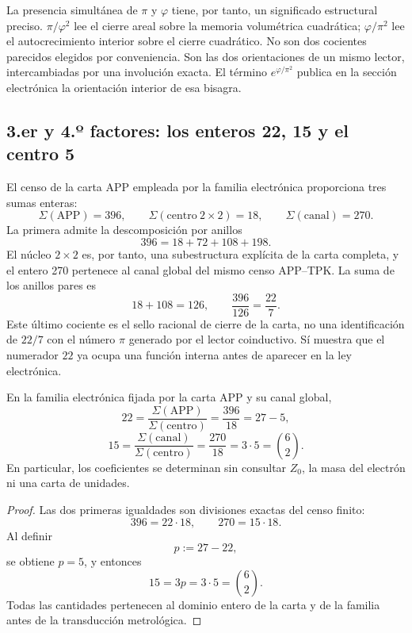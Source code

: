La presencia simultánea de \(\pi\) y \(\varphi\) tiene, por tanto, un
significado estructural preciso. \(\pi/\varphi^2\) lee el cierre areal
sobre la memoria volumétrica cuadrática; \(\varphi/\pi^2\) lee el
autocrecimiento interior sobre el cierre cuadrático. No son dos cocientes
parecidos elegidos por conveniencia. Son las dos orientaciones de un mismo
lector, intercambiadas por una involución exacta. El término
\(e^{\varphi/\pi^2}\) publica en la sección electrónica la orientación
interior de esa bisagra.

\subsection{3.er y 4.º factores: los enteros 22, 15 y el centro 5}

El censo de la carta APP empleada por la familia electrónica proporciona
tres sumas enteras:
\[
 \Sigma(\mathrm{APP})=396,
 \qquad
 \Sigma(\mathrm{centro}\ 2\times2)=18,
 \qquad
 \Sigma(\mathrm{canal})=270.
\]
La primera admite la descomposición por anillos
\[
 396=18+72+108+198.
\]
El núcleo \(2\times2\) es, por tanto, una subestructura explícita de la
carta completa, y el entero 270 pertenece al canal global del mismo censo
APP--TPK.
La suma de los anillos pares es
\[
 18+108=126,
 \qquad
 \frac{396}{126}=\frac{22}{7}.
\]
Este último cociente es el sello racional de cierre de la carta, no una
identificación de \(22/7\) con el número \(\pi\) generado por el lector
coinductivo. Sí muestra que el numerador \(22\) ya ocupa una función
interna antes de aparecer en la ley electrónica.

\begin{theorem}
\label{thm:coeficientes-electron-rev6}
En la familia electrónica fijada por la carta APP y su canal global,
\[
 \boxed{
 22=\frac{\Sigma(\mathrm{APP})}
 {\Sigma(\mathrm{centro})}
 =\frac{396}{18}=27-5,}
\]
\[
 \boxed{
 15=\frac{\Sigma(\mathrm{canal})}
 {\Sigma(\mathrm{centro})}
 =\frac{270}{18}=3\cdot5=\binom62.}
\]
En particular, los coeficientes se determinan sin consultar
\(Z_0\), la masa del electrón ni una carta de unidades.
\end{theorem}

\begin{proof}
Las dos primeras igualdades son divisiones exactas del censo finito:
\[
 396=22\cdot18,
 \qquad
 270=15\cdot18.
\]
Al definir
\[
 p:=27-22,
\]
se obtiene \(p=5\), y entonces
\[
 15=3p=3\cdot5=\binom62.
\]
Todas las cantidades pertenecen al dominio entero de la carta y de la
familia antes de la transducción metrológica.
\end{proof}

